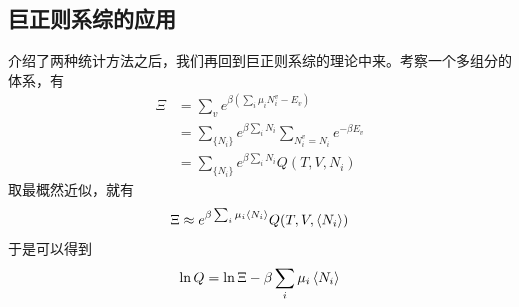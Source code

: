 \subsection{巨正则系综的应用} %
\label{sub:巨正则系综的应用}
介绍了两种统计方法之后，我们再回到巨正则系综的理论中来。考察一个多组分的体系，有\begin{equation}
\begin{aligned}
    \Xi &=\sum_v e^{\beta (\sum_i \mu_i N_i^v -E_v)}\\
    &=\sum_{\{N_i\}} e^{\beta \sum_i N_i} \sum_{N_i^v=N_i} e^{-\beta E_v} \\
    &=\sum_{\{N_i\}} e^{\beta \sum_i N_i} Q(T,V,N_i)
\end{aligned}
\end{equation}
取最概然近似，就有\begin{equation}
    \Xi \approx e^{\beta \sum_i \mu_i\braket{N_i}} Q(T,V,\braket{N_i})
\end{equation}
于是可以得到\begin{equation}
    \ln Q =\ln \Xi -\beta \sum_i \mu_i\braket{N_i}
    \label{equ:Q with Xi}
\end{equation}

